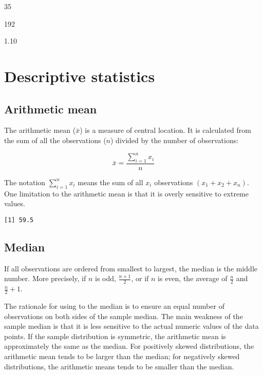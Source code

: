 \documentclass[]{book}
\newenvironment{Shaded}{\begin{snugshade}}{\end{snugshade}}
\newcommand{\KeywordTok}[1]{\textcolor[rgb]{0.13,0.29,0.53}{\textbf{#1}}}
\newcommand{\StringTok}[1]{\textcolor[rgb]{0.31,0.60,0.02}{#1}}
\newcommand{\CommentTok}[1]{\textcolor[rgb]{0.56,0.35,0.01}{\textit{#1}}}
\newcommand{\OperatorTok}[1]{\textcolor[rgb]{0.81,0.36,0.00}{\textbf{#1}}}
\newcommand{\NormalTok}[1]{#1}
\theoremstyle{definition}
\theoremstyle{definition}
\theoremstyle{definition}
\theoremstyle{remark}
\begin{document}
35

192

1.10

\chapter{Descriptive statistics}\label{descriptive-statistics}

\section{Arithmetic mean}\label{arithmetic-mean}

The arithmetic mean (\(\bar{x}\)) is a measure of central location. It
is calculated from the sum of all the observations (\({n}\)) divided by
the number of observations:

\[\bar{x}=\frac{\sum_{i=1}^nx_{i}}{n}\]

The notation \(\sum_{i=1}^nx_{i}\) means the sum of all \({x}_i\)
observations \(({x}_1+{x}_2+{x}_n)\). One limitation to the arithmetic
mean is that it is overly sensitive to extreme values.

\begin{Shaded}
\end{Shaded}

\begin{verbatim}
[1] 59.5
\end{verbatim}

\section{Median}\label{median}

If all observations are ordered from smallest to largest, the median is
the middle number. More precisely, if \({n}\) is odd, \(\frac{n+1}{2}\),
or if \({n}\) is even, the average of \(\frac{n}{2}\) and
\(\frac{n}{2}+1\).

The rationale for using to the median is to ensure an equal number of
observations on both sides of the sample median. The main weakness of
the sample median is that it is less sensitive to the actual numeric
values of the data points. If the sample distribution is symmetric, the
arithmetic mean is approximately the same as the median. For positively
skewed distributions, the arithmetic mean tends to be larger than the
median; for negatively skewed distributions, the arithmetic means tends
to be smaller than the median.
\end{document}
